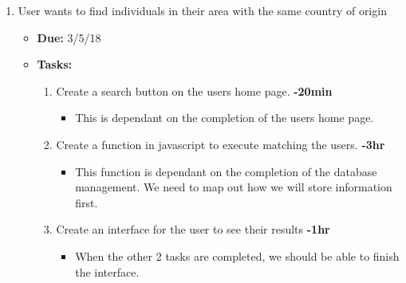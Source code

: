 \documentclass[12pt]{article}
\begin{document}
\begin{enumerate}
    \item User wants to find individuals in their area with the same country of origin
      \begin{itemize}dd
        \item \textbf{Due:} 3/5/18
        \item \textbf{Tasks:}
          \begin{enumerate}
            \item Create a search button on the users home page. \textbf{-20min}
              \begin{itemize}
                \item This is dependant on the completion of the users home page.
              \end{itemize}
            \item Create a function in javascript to execute matching the users. \textbf{-3hr}
              \begin{itemize}
                \item This function is dependant on the completion of the database management. We need to map out how we will store information first.
              \end{itemize}
            \item Create an interface for the user to see their results \textbf{-1hr}
              \begin{itemize}
                \item When the other 2 tasks are completed, we should be able to finish the interface.
              \end{itemize}
          \end{enumerate}
      \end{itemize}


\end{enumerate}
\end{document}
